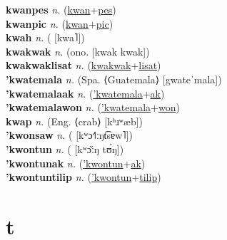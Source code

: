 \textbf{kwanpes} \textit{n.} (\hyperref[kwan]{kwan}+\hyperref[pes]{pes})
 \label{kwanpes} \\
\textbf{kwanpic} \textit{n.} (\hyperref[kwan]{kwan}+\hyperref[pic]{pic})
 \label{kwanpic} \\
\textbf{kwah} \textit{n.} ( [kwa˥])
 \label{kwah} \\
\textbf{kwakwak} \textit{n.} (ono. [kwak kwak])
 \label{kwakwak} \\
\textbf{kwakwaklisat} \textit{n.} (\hyperref[kwakwak]{kwakwak}+\hyperref[lisat]{lisat})
 \label{kwakwaklisat} \\
\textbf{'kwatemala} \textit{n.} (Spa. ⟨Guatemala⟩ [gwateˈmala])
 \label{'kwatemala} \\
\textbf{'kwatemalaak} \textit{n.} (\hyperref['kwatemala]{'kwatemala}+\hyperref[ak]{ak})
 \label{'kwatemalaak} \\
\textbf{'kwatemalawon} \textit{n.} (\hyperref['kwatemala]{'kwatemala}+\hyperref[won]{won})
 \label{'kwatemalawon} \\
\textbf{kwap} \textit{n.} (Eng. ⟨crab⟩ [kʰɹʷæb])
 \label{kwap} \\
\textbf{'kwonsaw} \textit{n.} ( [kʷɔ˧˥ːŋt͡sɐw˥])
 \label{'kwonsaw} \\
\textbf{'kwontun} \textit{n.} ( [kʷɔ̌ːŋ tʊ́ŋ])
 \label{'kwontun} \\
\textbf{'kwontunak} \textit{n.} (\hyperref['kwontun]{'kwontun}+\hyperref[ak]{ak})
 \label{'kwontunak} \\
\textbf{'kwontuntilip} \textit{n.} (\hyperref['kwontun]{'kwontun}+\hyperref[tilip]{tilip})
 \label{'kwontuntilip} 

\section{t}

